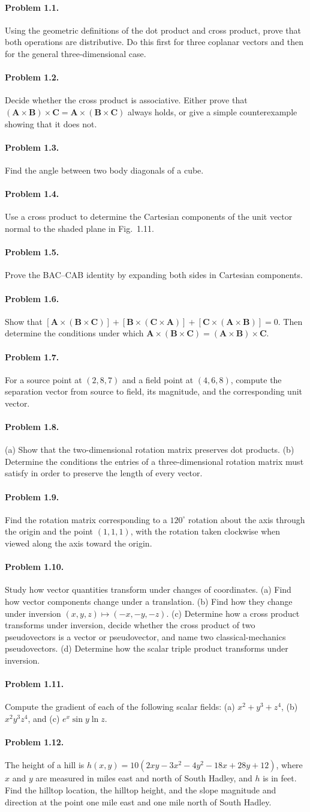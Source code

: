 \documentclass{aa}
\newcommand{\problemstatement}[2]{%
\paragraph{Problem #1.}#2\par\medskip
}
\begin{document}
\problemstatement{1.1}{Using the geometric definitions of the dot product and cross product, prove that both operations are distributive. Do this first for three coplanar vectors and then for the general three-dimensional case.}
\problemstatement{1.2}{Decide whether the cross product is associative. Either prove that \((\mathbf A \times \mathbf B)\times \mathbf C = \mathbf A \times (\mathbf B \times \mathbf C)\) always holds, or give a simple counterexample showing that it does not.}
\problemstatement{1.3}{Find the angle between two body diagonals of a cube.}
\problemstatement{1.4}{Use a cross product to determine the Cartesian components of the unit vector normal to the shaded plane in Fig.~1.11.}
\problemstatement{1.5}{Prove the BAC--CAB identity by expanding both sides in Cartesian components.}
\problemstatement{1.6}{Show that \([\mathbf A \times (\mathbf B \times \mathbf C)] + [\mathbf B \times (\mathbf C \times \mathbf A)] + [\mathbf C \times (\mathbf A \times \mathbf B)] = 0\). Then determine the conditions under which \(\mathbf A \times (\mathbf B \times \mathbf C) = (\mathbf A \times \mathbf B)\times \mathbf C\).}
\problemstatement{1.7}{For a source point at \((2,8,7)\) and a field point at \((4,6,8)\), compute the separation vector from source to field, its magnitude, and the corresponding unit vector.}
\problemstatement{1.8}{(a) Show that the two-dimensional rotation matrix preserves dot products. (b) Determine the conditions the entries of a three-dimensional rotation matrix must satisfy in order to preserve the length of every vector.}
\problemstatement{1.9}{Find the rotation matrix corresponding to a \(120^\circ\) rotation about the axis through the origin and the point \((1,1,1)\), with the rotation taken clockwise when viewed along the axis toward the origin.}
\problemstatement{1.10}{Study how vector quantities transform under changes of coordinates. (a) Find how vector components change under a translation. (b) Find how they change under inversion \((x,y,z)\mapsto(-x,-y,-z)\). (c) Determine how a cross product transforms under inversion, decide whether the cross product of two pseudovectors is a vector or pseudovector, and name two classical-mechanics pseudovectors. (d) Determine how the scalar triple product transforms under inversion.}
\problemstatement{1.11}{Compute the gradient of each of the following scalar fields: (a) \(x^2+y^3+z^4\), (b) \(x^2y^3z^4\), and (c) \(e^x\sin y\ln z\).}
\problemstatement{1.12}{The height of a hill is \(h(x,y)=10(2xy-3x^2-4y^2-18x+28y+12)\), where \(x\) and \(y\) are measured in miles east and north of South Hadley, and \(h\) is in feet. Find the hilltop location, the hilltop height, and the slope magnitude and direction at the point one mile east and one mile north of South Hadley.}
\end{document}
